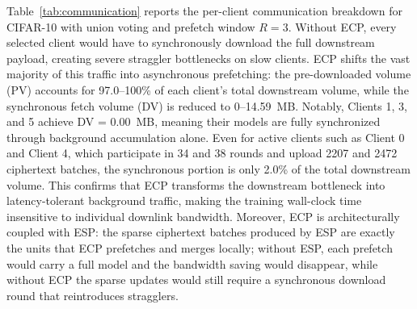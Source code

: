 Table~\ref{tab:communication} reports the per-client communication breakdown for CIFAR-10 with union voting and prefetch window $R=3$.
Without ECP, every selected client would have to synchronously download the full downstream payload, creating severe straggler bottlenecks on slow clients.
ECP shifts the vast majority of this traffic into asynchronous prefetching: the pre-downloaded volume (PV) accounts for 97.0--100\% of each client's total downstream volume, while the synchronous fetch volume (DV) is reduced to 0--14.59~MB.
Notably, Clients 1, 3, and 5 achieve DV = 0.00~MB, meaning their models are fully synchronized through background accumulation alone.
Even for active clients such as Client 0 and Client 4, which participate in 34 and 38 rounds and upload 2207 and 2472 ciphertext batches, the synchronous portion is only 2.0\% of the total downstream volume.
This confirms that ECP transforms the downstream bottleneck into latency-tolerant background traffic, making the training wall-clock time insensitive to individual downlink bandwidth.
Moreover, ECP is architecturally coupled with ESP: the sparse ciphertext batches produced by ESP are exactly the units that ECP prefetches and merges locally; without ESP, each prefetch would carry a full model and the bandwidth saving would disappear, while without ECP the sparse updates would still require a synchronous download round that reintroduces stragglers.
